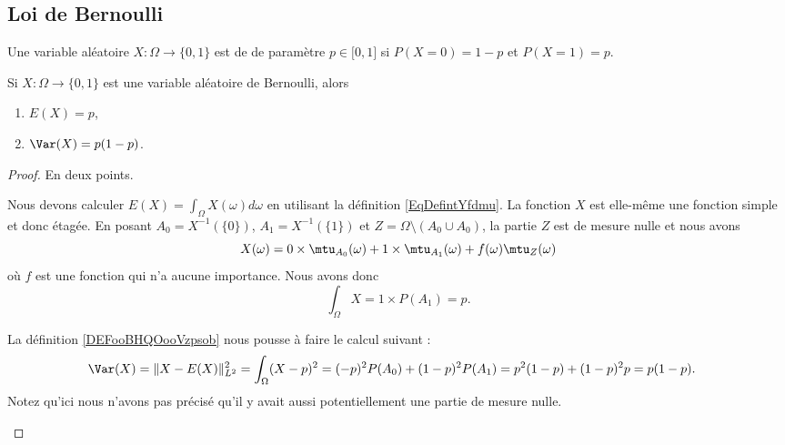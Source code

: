 \subsection{Loi de Bernoulli}

\begin{definition}	\label{DEFooHKZIooBXmNBb}
	Une variable aléatoire \(X \colon \Omega\to \{ 0,1 \}  \) est de  de paramètre \( p\in \mathopen[ 0,1\mathclose]\) si \( P(X=0)=1-p\) et \( P(X=1)=p\).
\end{definition}

\begin{proposition}	\label{PROPooJGAQooSSmybt}
	Si \(X \colon \Omega\to \{ 0,1 \}  \) est une variable aléatoire de Bernoulli, alors
	\begin{enumerate}
		\item		\label{ITEMooOKZQooOmIOJj}
		      \( E(X)=p\),
		\item		\label{ITEMooAWMOooOGhKzB}
		      \( \Var(X)=p(1-p)\).
	\end{enumerate}
\end{proposition}

\begin{proof}
	En deux points.
	\begin{subproof}
		Nous devons calculer \( E(X)=\int_{\Omega}X(\omega)d\omega\) en utilisant la définition \eqref{EqDefintYfdmu}. La fonction \( X\) est elle-même une fonction simple et donc étagée. En posant \( A_0=X^{-1}(\{ 0 \})\), \( A_1=X^{-1}(\{ 1 \})\) et \( Z=\Omega\setminus (A_0\cup A_0)\), la partie \( Z\) est de mesure nulle et nous avons
		\begin{equation}
			X(\omega)=0\times \mtu_{A_0}(\omega)+1\times \mtu_{A_1}(\omega)+f(\omega)\mtu_{Z}(\omega)
		\end{equation}
		où \( f\) est une fonction qui n'a aucune importance. Nous avons donc
		\begin{equation}
			\int_{\Omega}X=1\times P(A_1)=p.
		\end{equation}

		La définition \ref{DEFooBHQOooVzpsob} nous pousse à faire le calcul suivant :
		\begin{subequations}
			\begin{align}
				\Var(X) & =\| X-E(X) \|^2_{L^2}=\int_{\Omega}(X-p)^2=(-p)^2P(A_0)+(1-p)^2P(A_1)=p^2(1-p)+(1-p)^2p=p(1-p).
			\end{align}
		\end{subequations}
		Notez qu'ici nous n'avons pas précisé qu'il y avait aussi potentiellement une partie de mesure nulle.
	\end{subproof}
\end{proof}

